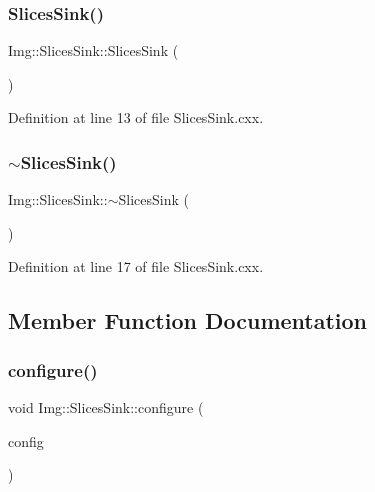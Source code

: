 \subsubsection{\texorpdfstring{Slices\+Sink()}{SlicesSink()}}
{\footnotesize\ttfamily Img\+::\+Slices\+Sink\+::\+Slices\+Sink (\begin{DoxyParamCaption}{ }\end{DoxyParamCaption})}



Definition at line 13 of file Slices\+Sink.\+cxx.

\mbox{\label{class_wire_cell_1_1_img_1_1_slices_sink_a75f494e0d83275ce37a122ccd4ba02a5}} 
\subsubsection{\texorpdfstring{$\sim$\+Slices\+Sink()}{~SlicesSink()}}
{\footnotesize\ttfamily Img\+::\+Slices\+Sink\+::$\sim$\+Slices\+Sink (\begin{DoxyParamCaption}{ }\end{DoxyParamCaption})\hspace{0.3cm}{\ttfamily [virtual]}}



Definition at line 17 of file Slices\+Sink.\+cxx.



\subsection{Member Function Documentation}
\mbox{\label{class_wire_cell_1_1_img_1_1_slices_sink_ae4651147b7d4f99b8a1e04c4552359e4}} 
\subsubsection{\texorpdfstring{configure()}{configure()}}
{\footnotesize\ttfamily void Img\+::\+Slices\+Sink\+::configure (\begin{DoxyParamCaption}\item[{const \hyperlink{namespace_wire_cell_a9f705541fc1d46c608b3d32c182333ee}{Wire\+Cell\+::\+Configuration} \&}]{config }\end{DoxyParamCaption})\hspace{0.3cm}{\ttfamily [virtual]}}



